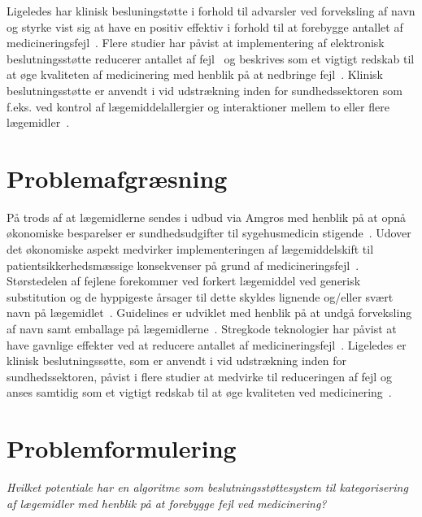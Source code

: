 Ligeledes har klinisk besluningstøtte i forhold til advarsler ved forveksling af navn og styrke vist sig at have en positiv effektiv i forhold til at forebygge antallet af medicineringsfejl~\citep{Campmans2018}. Flere studier har påvist at implementering af elektronisk beslutningsstøtte reducerer antallet af fejl~\citep{DW1998,Bates2013,Cheng2011,Raboel2005} og beskrives som et vigtigt redskab til at øge kvaliteten af medicinering med henblik på at nedbringe fejl~\citep{Raboel2005}. Klinisk beslutningsstøtte er anvendt i vid udstrækning inden for sundhedssektoren som f.eks. ved kontrol af lægemiddelallergier og interaktioner mellem to eller flere lægemidler~\citep{Raboel2005}. 

\section{Problemafgræsning}
På trods af at lægemidlerne sendes i udbud via Amgros med henblik på at opnå økonomiske besparelser er sundhedsudgifter til sygehusmedicin stigende~\citep{Sundhed2016,Sygehusapoteket2017}. Udover det økonomiske aspekt medvirker implementeringen af lægemiddelskift til patientsikkerhedsmæssige konsekvenser på grund af medicineringsfejl~\citep{DanskSelskabforPatientsikkerhed2009,Hakonsen2010}. Størstedelen af fejlene forekommer ved forkert lægemiddel ved generisk substitution og de hyppigeste årsager til dette skyldes lignende og/eller svært navn på lægemidlet~\citep{Hakonsen2010}. Guidelines er udviklet med henblik på at undgå forveksling af navn samt emballage på lægemidlerne~\citep{DanskSelskabforPatientsikkerhed2009}. Stregkode teknologier har påvist at have gavnlige effekter ved at reducere antallet af medicineringsfejl~\citep{Poon2006, Levtzion-korach2010}. Ligeledes er klinisk beslutningssøtte, som er anvendt i vid udstrækning inden for sundhedssektoren, påvist i flere studier at medvirke til reduceringen af fejl og anses samtidig som et vigtigt redskab til at øge kvaliteten ved medicinering~\citep{DW1998,Bates2013,Cheng2011,Raboel2005}.

\section{Problemformulering}
\textit{Hvilket potentiale har en algoritme som beslutningsstøttesystem til kategorisering af lægemidler med henblik på at forebygge fejl ved medicinering?}
